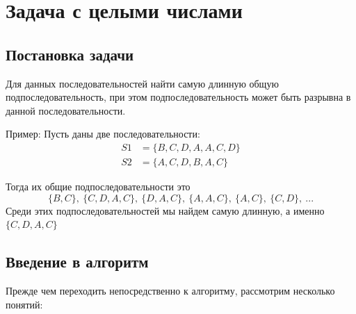 \documentclass[12pt]{article}
\begin{document}
\section{Задача с целыми числами}

\subsection{Постановка задачи}
 Для данных последовательностей найти самую длинную общую подпоследовательность, при этом
подпоследовательность может быть разрывна в данной последовательности.

Пример: Пусть даны две последовательности:
\begin{align*}
    S1 &= \{B, C, D, A, A, C, D\} \\
    S2 &= \{A, C, D, B, A, C\}
\end{align*}

Тогда их общие подпоследовательности это
$$\{B, C\},\ \{C, D, A, C\},\ \{D, A, C\},\ \{A, A, C\},\ \{A, C\},\ \{C, D\},\ ...$$
Среди этих подпоследовательностей мы найдем
самую длинную, а именно $\{C, D, A, C\}$
\subsection{Введение в алгоритм}
Прежде чем переходить непосредственно к алгоритму,
    рассмотрим несколько понятий:
\end{document}
